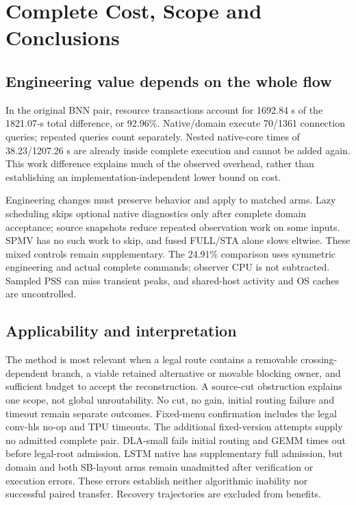 \documentclass[conference,10pt]{IEEEtran}
\begin{document}
\section{Complete Cost, Scope and Conclusions}
\subsection{Engineering value depends on the whole flow}
In the original BNN pair, resource transactions account for 1692.84 s of the 1821.07-s total difference, or 92.96\%. Native/domain execute 70/1361 connection queries; repeated queries count separately. Nested native-core times of 38.23/1207.26 s are already inside complete execution and cannot be added again. This work difference explains much of the observed overhead, rather than establishing an implementation-independent lower bound on cost.

Engineering changes must preserve behavior and apply to matched arms. Lazy scheduling skips optional native diagnostics only after complete domain acceptance; source snapshots reduce repeated observation work on some inputs. SPMV has no such work to skip, and fused FULL/STA alone slows eltwise. These mixed controls remain supplementary. The 24.91\% comparison uses symmetric engineering and actual complete commands; observer CPU is not subtracted. Sampled PSS can miss transient peaks, and shared-host activity and OS caches are uncontrolled.

\subsection{Applicability and interpretation}
The method is most relevant when a legal route contains a removable crossing-dependent branch, a viable retained alternative or movable blocking owner, and sufficient budget to accept the reconstruction. A source-cut obstruction explains one scope, not global unroutability. No cut, no gain, initial routing failure and timeout remain separate outcomes. Fixed-menu confirmation includes the legal conv-hls no-op and TPU timeouts. The additional fixed-version attempts supply no admitted complete pair. DLA-small fails initial routing and GEMM times out before legal-root admission. LSTM native has supplementary full admission, but domain and both SB-layout arms remain unadmitted after verification or execution errors. These errors establish neither algorithmic inability nor successful paired transfer. Recovery trajectories are excluded from benefits.
\end{document}
